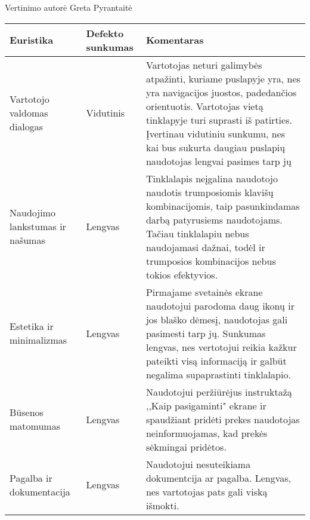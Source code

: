 \documentclass[oneside]{VUMIFPSkursinis}
\begin{document}
Vertinimo autorė Greta Pyrantaitė
\begin{center}
    \begin{tabular}{ |p{3cm}| p{3cm} | p{11cm} | }
    \hline
	Euristika &Defekto sunkumas & Komentaras \\ \hline
	Vartotojo valdomas dialogas & Vidutinis & Vartotojas neturi galimybės atpažinti, kuriame puslapyje yra, nes yra navigacijos juostos, padedančios orientuotis. Vartotojas vietą tinklapyje turi suprasti iš patirties. Įvertinau vidutiniu sunkumu, nes kai bus sukurta daugiau puslapių naudotojas lengvai pasimes tarp jų \\ \hline
	Naudojimo lankstumas ir našumas & Lengvas & Tinklalapis neįgalina naudotojo naudotis trumposiomis klavišų kombinacijomis, taip pasunkindamas darbą patyrusiems naudotojams. Tačiau tinklalapiu nebus naudojamasi dažnai, todėl ir trumposios kombinacijos nebus tokios efektyvios. \\ \hline
	Estetika ir minimalizmas & Lengvas & Pirmajame svetainės ekrane naudotojui parodoma daug ikonų ir jos blaško dėmesį, naudotojas gali pasimesti tarp jų. Sunkumas lengvas, nes vertotojui reikia kažkur pateikti visą informaciją ir galbūt negalima supaprastinti tinklalapio. \\ \hline
	Būsenos matomumas & Lengvas & Naudotojui peržiūrėjus instruktažą ,,Kaip pasigaminti" ekrane ir spaudžiant pridėti prekes naudotojas neinformuojamas, kad prekės sėkmingai pridėtos. \\ \hline
	Pagalba ir dokumentacija & Lengvas & Naudotojui nesuteikiama dokumentcija ar pagalba. Lengvas, nes vartotojas pats gali viską išmokti. \\ \hline	 
   \hline
    \end{tabular}
\end{center}

\pagebreak
\end{document}
